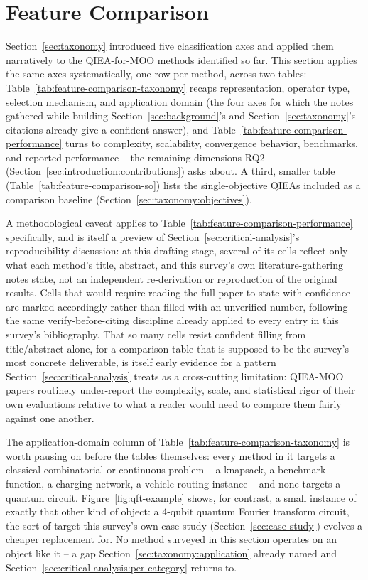 \section{Feature Comparison}
\label{sec:feature-comparison}

Section~\ref{sec:taxonomy} introduced five classification axes and
applied them narratively to the QIEA-for-MOO methods identified so far.
This section applies the same axes systematically, one row per method,
across two tables: Table~\ref{tab:feature-comparison-taxonomy} recaps
representation, operator type, selection mechanism, and application
domain (the four axes for which the notes gathered while building
Section~\ref{sec:background}'s and Section~\ref{sec:taxonomy}'s
citations already give a confident answer), and
Table~\ref{tab:feature-comparison-performance} turns to complexity,
scalability, convergence behavior, benchmarks, and reported performance
-- the remaining dimensions RQ2
(Section~\ref{sec:introduction:contributions}) asks about. A third,
smaller table (Table~\ref{tab:feature-comparison-so}) lists the
single-objective QIEAs included as a comparison baseline
(Section~\ref{sec:taxonomy:objectives}).

A methodological caveat applies to Table~\ref{tab:feature-comparison-performance}
specifically, and is itself a preview of
Section~\ref{sec:critical-analysis}'s reproducibility discussion: at
this drafting stage, several of its cells reflect only what each
method's title, abstract, and this survey's own literature-gathering
notes state, not an independent re-derivation or reproduction of the
original results. Cells that would require reading the full paper to
state with confidence are marked accordingly rather than filled with an
unverified number, following the same verify-before-citing discipline
already applied to every entry in this survey's bibliography. That so
many cells resist confident filling from title/abstract alone, for a
comparison table that is supposed to be the survey's most concrete
deliverable, is itself early evidence for a pattern
Section~\ref{sec:critical-analysis} treats as a cross-cutting limitation:
QIEA-MOO papers routinely under-report the complexity, scale, and
statistical rigor of their own evaluations relative to what a reader
would need to compare them fairly against one another.

The application-domain column of Table~\ref{tab:feature-comparison-taxonomy}
is worth pausing on before the tables themselves: every method in it
targets a classical combinatorial or continuous problem -- a knapsack,
a benchmark function, a charging network, a vehicle-routing instance --
and none targets a quantum circuit. Figure~\ref{fig:qft-example} shows,
for contrast, a small instance of exactly that other kind of object: a
4-qubit quantum Fourier transform circuit, the sort of target this
survey's own case study (Section~\ref{sec:case-study}) evolves a
cheaper replacement for. No method surveyed in this section operates on
an object like it -- a gap Section~\ref{sec:taxonomy:application}
already named and Section~\ref{sec:critical-analysis:per-category}
returns to.

